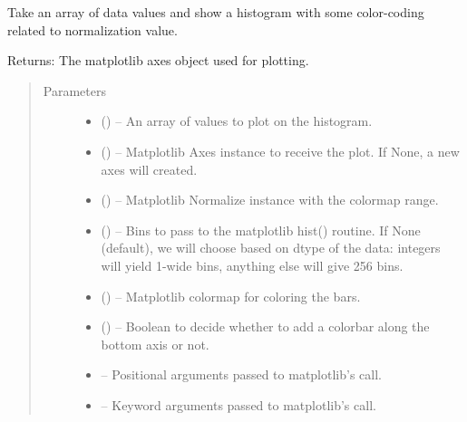\documentclass[letterpaper,10pt,english]{sphinxmanual}
\begin{document}
\begin{fulllineitems}
\label{\detokenize{xanespy:xanespy.plots.plot_txm_histogram}}
Take an array of data values and show a histogram with some
color-coding related to normalization value.

Returns: The matplotlib axes object used for plotting.
\begin{quote}\begin{description}
\item[{Parameters}] \leavevmode\begin{itemize}
\item {} 
 () -- An array of values to plot on the histogram.

\item {} 
 () -- Matplotlib Axes instance to receive the plot. If None, a new axes
will created.

\item {} 
 () -- Matplotlib Normalize instance with the colormap range.

\item {} 
 () -- Bins to pass to the matplotlib hist() routine. If None
(default), we will choose based on dtype of the data: integers
will yield 1-wide bins, anything else will give 256 bins.

\item {} 
 (\sphinxstyleliteralemphasis{, }) -- Matplotlib colormap for coloring the bars.

\item {} 
 (\sphinxstyleliteralemphasis{, }) -- Boolean to decide whether to add a colorbar along the
bottom axis or not.

\item {} 
 -- Positional arguments passed to matplotlib's  call.

\item {} 
 -- Keyword arguments passed to matplotlib's  call.

\end{itemize}

\end{description}\end{quote}

\end{fulllineitems}
\end{document}
